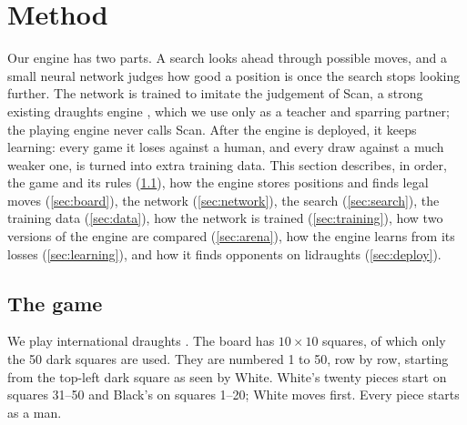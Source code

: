 \section{Method}\label{sec:method}

Our engine has two parts. A search looks ahead through possible moves, and a
small neural network judges how good a position is once the search stops
looking further. The network is trained to imitate the judgement of Scan, a strong
existing draughts engine \parencite{letouzey_scan}, which we use only as a teacher
and sparring partner; the playing engine never calls Scan. After the engine is
deployed, it keeps learning: every game it loses against a human, and every draw
against a much weaker one, is turned into extra training data. This section describes, in order, the game and its rules
(\cref{sec:rules}), how the engine stores positions and finds legal moves
(\cref{sec:board}), the network (\cref{sec:network}), the search
(\cref{sec:search}), the training data (\cref{sec:data}), how the network is
trained (\cref{sec:training}), how two versions of the engine are compared
(\cref{sec:arena}), how the engine learns from its losses
(\cref{sec:learning}), and how it finds opponents on lidraughts
(\cref{sec:deploy}).

\subsection{The game}\label{sec:rules}

We play international draughts \parencite{fmjd_rules}. The board has $10\times10$
squares, of which only the 50 dark squares are used. They are numbered 1 to 50,
row by row, starting from the top-left dark square as seen by White. White's
twenty pieces start on squares 31--50 and Black's on squares 1--20; White moves
first. Every piece starts as a man.

